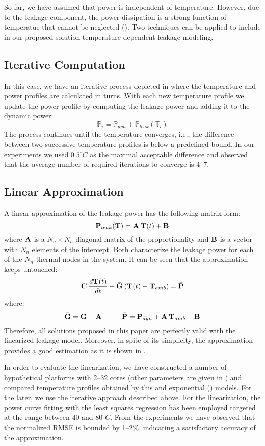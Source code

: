 So far, we have assumed that power is independent of temperature. However, due to the leakage component, the power dissipation is a strong function of temperatue that cannot be neglected (). Two techniques can be applied to include in our proposed solution temperature dependent leakage modeling.

\subsection{Iterative Computation} \label{sec:iterative-leakage}
In this case, we have an iterative process depicted in  where the temperature and power profiles are calculated in turns. With each new temperature profile we update the power profile by computing the leakage power and adding it to the dynamic power:
\[
  \mathbb{P}_i = \mathbb{P}_{dyn} + \mathbb{P}_{leak}(\mathbb{T}_i)
\]
The process continues until the temperature converges, i.e., the difference between two successive temperature profiles is below a predefined bound. In our experiments we used $0.5^\circ C$ as the maximal acceptable difference and observed that the average number of required iterations to converge is 4--7.

\subsection{Linear Approximation} \label{sec:linearized-leakage}
A linear approximation of the leakage power has the following matrix form:
\[
  \mathbf{P}_{leak}(\mathbf{T}) = \mathbf{A} \: \mathbf{T}(t) + \mathbf{B}
\]
where $\mathbf{A}$ is a $N_n \times N_n$ diagonal matrix of the proportionality and $\mathbf{B}$ is a vector with $N_n$ elements of the intercept. Both characterize the leakage power for each of the $N_n$ thermal nodes in the system. It can be seen that the approximation keeps  untouched:
\[
  \mathbf{C} \: \frac{d\mathbf{T}(t)}{dt} + \bar{\mathbf{G}} \: (\mathbf{T}(t) - \mathbf{T}_{amb}) = \bar{\mathbf{P}}
\]
where:
\[
  \bar{\m{G}} = \m{G} - \m{A} \hs \bar{\v{P}} = \v{P}_{dyn} + \m{A} \: \v{T}_{amb} + \v{B}
\]
Therefore, all solutions proposed in this paper are perfectly valid with the linearized leakage model. Moreover, in spite of its simplicity, the approximation provides a good estimation as it is shown in \cite{liu2007}.

In order to evaluate the linearization, we have constructed a number of hypothetical platforms with 2--32 cores (other parameters are given in ) and compared temperature profiles obtained by this and exponential () models. For the later, we use the iterative approach described above. For the linearization, the power curve fitting with the least squares regression \cite{press2007} has been employed targeted at the range between 40 and $80^\circ C$. From the experiments we have observed that the normalized RMSE is bounded by 1--2\%, indicating a satisfactory accuracy of the approximation.
